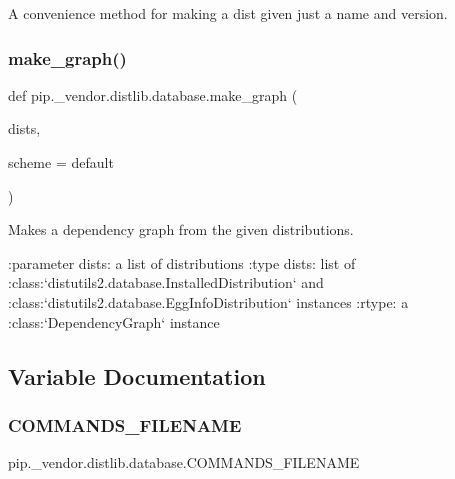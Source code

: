\begin{DoxyVerb}A convenience method for making a dist given just a name and version.
\end{DoxyVerb}
 \mbox{\label{namespacepip_1_1__vendor_1_1distlib_1_1database_ad5cd1646c2526fe39bb39eb0c87da7b9}} 
\subsubsection{\texorpdfstring{make\+\_\+graph()}{make\_graph()}}
{\footnotesize\ttfamily def pip.\+\_\+vendor.\+distlib.\+database.\+make\+\_\+graph (\begin{DoxyParamCaption}\item[{}]{dists,  }\item[{}]{scheme = {\ttfamily \textquotesingle{}default\textquotesingle{}} }\end{DoxyParamCaption})}

\begin{DoxyVerb}Makes a dependency graph from the given distributions.

:parameter dists: a list of distributions
:type dists: list of :class:`distutils2.database.InstalledDistribution` and
             :class:`distutils2.database.EggInfoDistribution` instances
:rtype: a :class:`DependencyGraph` instance
\end{DoxyVerb}
 

\subsection{Variable Documentation}
\mbox{\label{namespacepip_1_1__vendor_1_1distlib_1_1database_a5f2dd43a7bbc0b02722962070a231b11}} 
\subsubsection{\texorpdfstring{C\+O\+M\+M\+A\+N\+D\+S\+\_\+\+F\+I\+L\+E\+N\+A\+ME}{COMMANDS\_FILENAME}}
{\footnotesize\ttfamily pip.\+\_\+vendor.\+distlib.\+database.\+C\+O\+M\+M\+A\+N\+D\+S\+\_\+\+F\+I\+L\+E\+N\+A\+ME}

